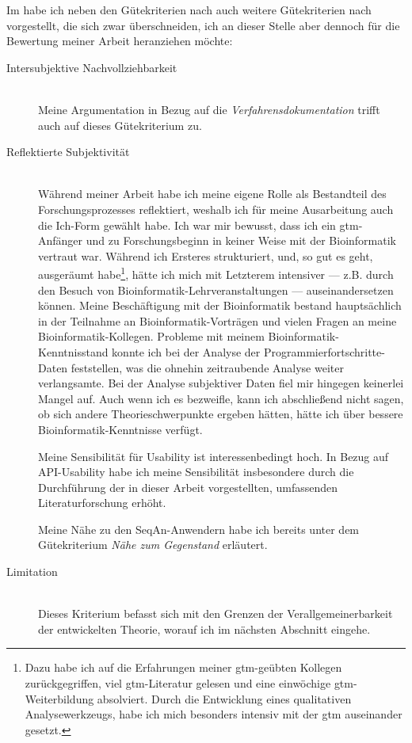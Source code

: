 Im  habe ich neben den Gütekriterien nach \cite{mayring2002einfhrung} auch weitere Gütekriterien nach \cite{gesis-solis-00272267} vorgestellt, die sich zwar überschneiden, ich an dieser Stelle aber dennoch für die Bewertung meiner Arbeit heranziehen möchte:
\begin{description}
  \item[Intersubjektive Nachvollziehbarkeit] \hfill \\
  Meine Argumentation in Bezug auf die \textit{Verfahrensdokumentation} trifft auch auf dieses Gütekriterium zu.
   
  \item[Reflektierte Subjektivität] \hfill \\
  Während meiner Arbeit habe ich meine eigene Rolle als Bestandteil des Forschungsprozesses reflektiert, weshalb ich für meine Ausarbeitung auch die Ich-Form gewählt habe. Ich war mir bewusst, dass ich ein \gls{gtm}-Anfänger und zu Forschungsbeginn in keiner Weise mit der Bioinformatik vertraut war. Während ich Ersteres strukturiert, und, so gut es geht, ausgeräumt habe\footnote{Dazu habe ich auf die Erfahrungen meiner \gls{gtm}-geübten Kollegen zurückgegriffen,  viel \gls{gtm}-Literatur gelesen und eine einwöchige \gls{gtm}-Weiterbildung absolviert. Durch die Entwicklung eines qualitativen Analysewerkzeugs, habe ich mich besonders intensiv mit der \gls{gtm} auseinander gesetzt.}, hätte ich mich mit Letzterem intensiver --- z.B. durch den Besuch von Bioinformatik-Lehrveranstaltungen --- auseinandersetzen können. Meine Beschäftigung mit der Bioinformatik bestand hauptsächlich in der Teilnahme an Bioinformatik-Vorträgen und vielen Fragen an meine Bioinformatik-Kollegen. Probleme mit meinem Bioinformatik-Kenntnisstand konnte ich bei der Analyse der Programmierfortschritte-Daten feststellen, was die ohnehin zeitraubende Analyse weiter verlangsamte. Bei der Analyse subjektiver Daten fiel mir hingegen keinerlei Mangel auf. Auch wenn ich es bezweifle, kann ich abschließend nicht sagen, ob sich andere Theorieschwerpunkte ergeben hätten, hätte ich über bessere Bioinformatik-Kenntnisse verfügt.
  
  Meine Sensibilität für Usability ist interessenbedingt hoch. In Bezug auf API-Usability habe ich meine Sensibilität insbesondere durch die Durchführung der in dieser Arbeit vorgestellten, umfassenden Literaturforschung erhöht.
  
  Meine Nähe zu den SeqAn-Anwendern habe ich bereits unter dem Gütekriterium \textit{Nähe zum Gegenstand} erläutert.

  \item[Limitation]\hfill \\
  Dieses Kriterium befasst sich mit den Grenzen der Verallgemeinerbarkeit der entwickelten Theorie, worauf ich im nächsten Abschnitt eingehe.
\end{description}

